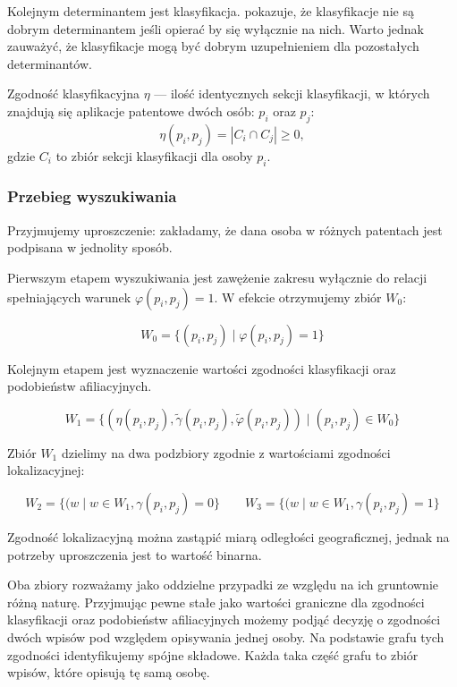 Kolejnym determinantem jest klasyfikacja. 
pokazuje, że klasyfikacje nie są dobrym determinantem jeśli opierać by się wyłącznie 
na nich. Warto jednak zauważyć, że klasyfikacje mogą być dobrym uzupełnieniem
dla pozostałych determinantów.

\begin{defi}\label{defi:zgodność-clsf}
Zgodność klasyfikacyjna $\eta$ --- ilość identycznych sekcji klasyfikacji,
w których znajdują się aplikacje patentowe dwóch osób: $p_i$ oraz $p_j$:
$$\eta(p_i, p_j) = | C_i \cap C_j | \ge 0,$$
gdzie $C_i$ to zbiór sekcji klasyfikacji dla osoby $p_i$.
\end{defi}

\subsubsection{Przebieg wyszukiwania}

\begin{uwaga}
Przyjmujemy uproszczenie: zakładamy, że dana osoba w różnych patentach 
jest podpisana w jednolity sposób.
\end{uwaga}

Pierwszym etapem wyszukiwania jest zawężenie zakresu wyłącznie do relacji
spełniających warunek $\varphi(p_i, p_j) = 1$.
W efekcie otrzymujemy zbiór $W_0$:

$$W_0 = \{ (p_i, p_j)\mid \varphi(p_i, p_j) = 1 \}$$

Kolejnym etapem jest wyznaczenie wartości zgodności klasyfikacji oraz 
podobieństw afiliacyjnych.

$$W_1 = \{ ( \eta(p_i, p_j), \tilde \gamma(p_i, p_j), \tilde \varphi(p_i, p_j) ) \mid (p_i, p_j) \in W_0 \}$$

Zbiór $W_1$ dzielimy na dwa podzbiory zgodnie z wartościami zgodności lokalizacyjnej:

$$
W_2 = \{ ( w \mid w \in W_1, \gamma(p_i, p_j) = 0 \}\qquad 
W_3 = \{ ( w \mid w \in W_1, \gamma(p_i, p_j) = 1 \}
$$

\begin{uwaga}
Zgodność lokalizacyjną można zastąpić miarą odległości geograficznej,
jednak na potrzeby uproszczenia jest to wartość binarna.
\end{uwaga}

Oba zbiory rozważamy jako oddzielne przypadki ze względu na ich
gruntownie różną naturę. Przyjmując pewne stałe jako wartości
graniczne dla zgodności klasyfikacji oraz podobieństw afiliacyjnych
możemy podjąć decyzję o zgodności dwóch wpisów pod względem
opisywania jednej osoby. Na podstawie grafu tych zgodności
identyfikujemy spójne składowe. Każda taka część grafu to
zbiór wpisów, które opisują tę samą osobę.



